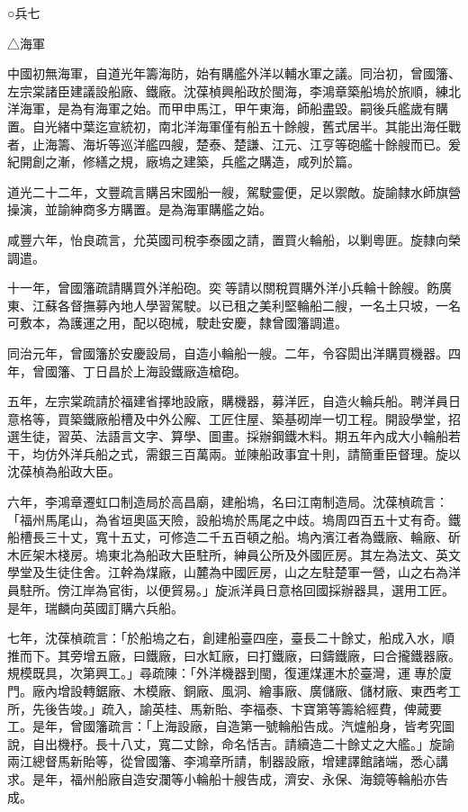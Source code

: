 
\begin{pinyinscope}
○兵七

△海軍

中國初無海軍，自道光年籌海防，始有購艦外洋以輔水軍之議。同治初，曾國籓、左宗棠諸臣建議設船廠、鐵廠。沈葆楨興船政於閩海，李鴻章築船塢於旅順，練北洋海軍，是為有海軍之始。而甲申馬江，甲午東海，師船盡毀。嗣後兵艦歲有購置。自光緒中葉迄宣統初，南北洋海軍僅有船五十餘艘，舊式居半。其能出海任戰者，止海籌、海圻等巡洋艦四艘，楚泰、楚謙、江元、江亨等砲艦十餘艘而已。爰紀開創之漸，修繕之規，廠塢之建築，兵艦之購造，咸列於篇。

道光二十二年，文豐疏言購呂宋國船一艘，駕駛靈便，足以禦敵。旋諭隸水師旗營操演，並諭紳商多方購置。是為海軍購艦之始。

咸豐六年，怡良疏言，允英國司稅李泰國之請，置買火輪船，以剿粵匪。旋隸向榮調遣。

十一年，曾國籓疏請購買外洋船砲。奕等請以關稅買購外洋小兵輪十餘艘。飭廣東、江蘇各督撫募內地人學習駕駛。以已租之美利堅輪船二艘，一名土只坡，一名可敷本，為護運之用，配以砲械，駛赴安慶，隸曾國籓調遣。

同治元年，曾國籓於安慶設局，自造小輪船一艘。二年，令容閎出洋購買機器。四年，曾國籓、丁日昌於上海設鐵廠造槍砲。

五年，左宗棠疏請於福建省擇地設廠，購機器，募洋匠，自造火輪兵船。聘洋員日意格等，買築鐵廠船槽及中外公廨、工匠住屋、築基砌岸一切工程。開設學堂，招選生徒，習英、法語言文字、算學、圖畫。採辦鋼鐵木料。期五年內成大小輪船若干，均仿外洋兵船之式，需銀三百萬兩。並陳船政事宜十則，請簡重臣督理。旋以沈葆楨為船政大臣。

六年，李鴻章遷虹口制造局於高昌廟，建船塢，名曰江南制造局。沈葆楨疏言：「福州馬尾山，為省垣奧區天險，設船塢於馬尾之中歧。塢周四百五十丈有奇。鐵船槽長三十丈，寬十五丈，可修造二千五百頓之船。塢內濱江者為鐵廠、輪廠、斫木匠架木棧房。塢東北為船政大臣駐所，紳員公所及外國匠房。其左為法文、英文學堂及生徒住舍。江幹為煤廠，山麓為中國匠房，山之左駐楚軍一營，山之右為洋員駐所。傍江岸為官街，以便貿易。」旋派洋員日意格回國採辦器具，選用工匠。是年，瑞麟向英國訂購六兵船。

七年，沈葆楨疏言：「於船塢之右，創建船臺四座，臺長二十餘丈，船成入水，順推而下。其旁增五廠，曰鐵廠，曰水缸廠，曰打鐵廠，曰鑄鐵廠，曰合攏鐵器廠。規模既具，次第興工。」尋疏陳：「外洋機器到閩，復運煤運木於臺灣，運專於廈門。廠內增設轉鋸廠、木模廠、銅廠、風洞、繪事廠、廣儲廠、儲材廠、東西考工所，先後告竣。」疏入，諭英桂、馬新貽、李福泰、卞寶第等籌給經費，俾蕆要工。是年，曾國籓疏言：「上海設廠，自造第一號輪船告成。汽爐船身，皆考究圖說，自出機杼。長十八丈，寬二丈餘，命名恬吉。請續造二十餘丈之大艦。」旋諭兩江總督馬新貽等，從曾國籓、李鴻章所請，制器設廠，增建譯館諸端，悉心講求。是年，福州船廠自造安瀾等小輪船十艘告成，濟安、永保、海鏡等輪船亦告成。


\end{pinyinscope}
